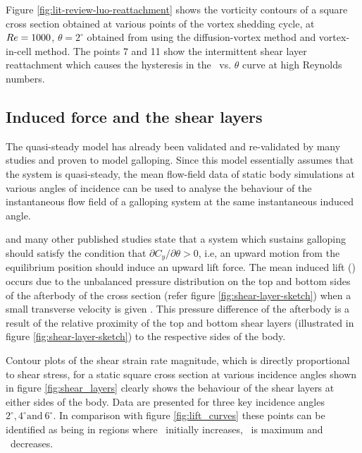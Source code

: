 

Figure \ref{fig:lit-review-luo-reattachment} shows the vorticity contours of a square cross section obtained at various points of the vortex shedding cycle, at $Re=1000$, $\theta=2^{\circ}$ obtained from \citet{Luo2003}using the  diffusion-vortex method and vortex-in-cell method. The points 7 and 11 show the intermittent shear layer reattachment which causes the hysteresis in the \cy\ vs. $\theta$ curve at high Reynolds numbers.

\vspace{20mm}   

\subsection{Induced force and the shear layers}
\label{subsec:c_y and shear layers}

 The quasi-steady model has already been validated and re-validated by many studies \citep{Parkinson1964,Barrero-Gil2009,Luo2003} and proven to model galloping. Since this model essentially assumes that the system is quasi-steady, the mean flow-field data of static body simulations at various angles of incidence can be used to analyse the behaviour of the instantaneous flow field of a galloping system at the same instantaneous induced angle. 
 
 





\citet{Paidoussis2010,Parkinson1964,Barrero-Gil2010a} and many other published studies state that a system which sustains galloping should satisfy the condition that $\partial C_y/\partial \theta>0$, i.e, an upward motion from the equilibrium position should induce an upward lift force. The mean induced lift (\cy) occurs due to the unbalanced pressure distribution on the top and bottom sides of the afterbody of the cross section (refer figure \ref{fig:shear-layer-sketch}) when a small transverse velocity is given \citep{Parkinson1989}. This pressure difference of the afterbody is a result of the relative proximity of the top and bottom shear layers (illustrated in figure \ref{fig:shear-layer-sketch}) to the respective sides of the body. 

Contour plots of the shear strain rate magnitude, which is directly proportional to shear stress, for a static square cross section at various incidence angles shown in figure \ref{fig:shear_layers} clearly shows the behaviour of the shear layers at either sides of the body. Data are presented for three key incidence angles $2^{\circ}, 4^{\circ} \text{and}\ 6^{\circ}$. In comparison with figure \ref{fig:lift_curves} these points can be identified as being in regions where \cy\ initially increases, \cy\ is maximum and \cy\ decreases. 

